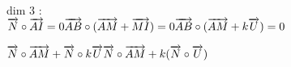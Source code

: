 \documentclass[a4paper]{article}
\begin{document}
dim 3 : \\
\begin{math}
  \overrightarrow{N} \circ \overrightarrow{AI} = 0\\
  \overrightarrow{AB} \circ (\overrightarrow{AM} + \overrightarrow{MI}) = 0\\
  \overrightarrow{AB} \circ (\overrightarrow{AM} + k\overrightarrow{U}) = 0
\end{math}

\begin{math}
  \overrightarrow{N} \circ \overrightarrow{AM} + \overrightarrow{N} \circ k\overrightarrow{U}\\
  \overrightarrow{N} \circ \overrightarrow{AM} + k(\overrightarrow{N} \circ \overrightarrow{U})\\
\end{math}
\end{document}
